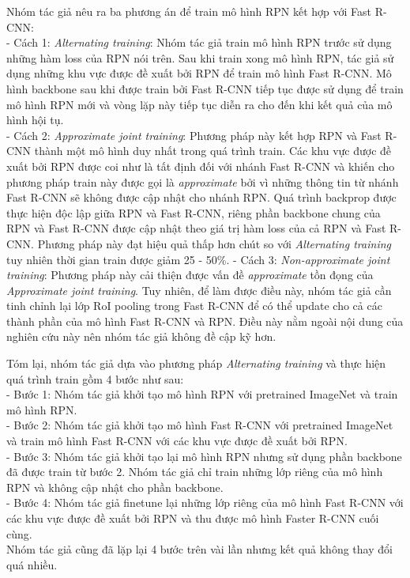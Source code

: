 {    \noindent
    Nhóm tác giả nêu ra ba phương án để train mô hình RPN kết hợp với Fast R-CNN: \\
    - Cách 1: \textit{Alternating training}: Nhóm tác giả train mô hình RPN trước sử dụng những hàm loss của RPN nói trên.
    Sau khi train xong mô hình RPN, tác giả sử dụng những khu vực được đề xuất bởi RPN để train mô hình Fast R-CNN.
    Mô hình backbone sau khi được train bởi Fast R-CNN tiếp tục được sử dụng để train mô hình RPN mới và vòng lặp này tiếp tục diễn ra cho đến khi kết quả của mô hình hội tụ. \\
    - Cách 2: \textit{Approximate joint training}: Phương pháp này kết hợp RPN và Fast R-CNN thành một mô hình duy nhất trong quá trình train.
    Các khu vực được đề xuất bởi RPN được coi như là tất định đối với nhánh Fast R-CNN và khiến cho phương pháp train này được gọi là \textit{approximate} bởi vì những thông tin từ nhánh Fast R-CNN sẽ không được cập nhật cho nhánh RPN.
    Quá trình backprop được thực hiện độc lập giữa RPN và Fast R-CNN, riêng phần backbone chung của RPN và Fast R-CNN được cập nhật theo giá trị hàm loss của cả RPN và Fast R-CNN.
    Phương pháp này đạt hiệu quả thấp hơn chút so với \textit{Alternating training} tuy nhiên thời gian train được giảm 25 - 50\%.
    - Cách 3: \textit{Non-approximate joint training}: Phương pháp này cải thiện được vấn đề \textit{approximate} tồn đọng của \textit{Approximate joint training}.
    Tuy nhiên, để làm được điều này, nhóm tác giả cần tinh chỉnh lại lớp RoI pooling trong Fast R-CNN để có thể update cho cả các thành phần của mô hình Fast R-CNN và RPN.
    Điều này nằm ngoài nội dung của nghiên cứu này nên nhóm tác giả không đề cập kỹ hơn.

    \noindent
    Tóm lại, nhóm tác giả dựa vào phương pháp \textit{Alternating training} và thực hiện quá trình train gồm 4 bước như sau: \\
    - Bước 1: Nhóm tác giả khởi tạo mô hình RPN với pretrained ImageNet và train mô hình RPN. \\
    - Bước 2: Nhóm tác giả khởi tạo mô hình Fast R-CNN với pretrained ImageNet và train mô hình Fast R-CNN với các khu vực được đề xuất bởi RPN. \\
    - Bước 3: Nhóm tác giả khởi tạo lại mô hình RPN nhưng sử dụng phần backbone đã được train từ bước 2.
    Nhóm tác giả chỉ train những lớp riêng của mô hình RPN và không cập nhật cho phần backbone. \\
    - Bước 4: Nhóm tác giả finetune lại những lớp riêng của mô hình Fast R-CNN với các khu vực được đề xuất bởi RPN và thu được mô hình Faster R-CNN cuối cùng. \\
    Nhóm tác giả cũng đã lặp lại 4 bước trên vài lần nhưng kết quả không thay đổi quá nhiều.

}
